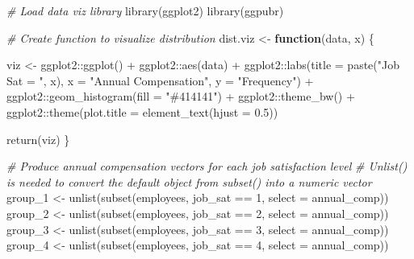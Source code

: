\documentclass[
]{book}
\newenvironment{Shaded}{\begin{snugshade}}{\end{snugshade}}
\newcommand{\AttributeTok}[1]{\textcolor[rgb]{0.77,0.63,0.00}{#1}}
\newcommand{\CommentTok}[1]{\textcolor[rgb]{0.56,0.35,0.01}{\textit{#1}}}
\newcommand{\ControlFlowTok}[1]{\textcolor[rgb]{0.13,0.29,0.53}{\textbf{#1}}}
\newcommand{\DecValTok}[1]{\textcolor[rgb]{0.00,0.00,0.81}{#1}}
\newcommand{\FloatTok}[1]{\textcolor[rgb]{0.00,0.00,0.81}{#1}}
\newcommand{\FunctionTok}[1]{\textcolor[rgb]{0.00,0.00,0.00}{#1}}
\newcommand{\NormalTok}[1]{#1}
\newcommand{\OtherTok}[1]{\textcolor[rgb]{0.56,0.35,0.01}{#1}}
\newcommand{\SpecialCharTok}[1]{\textcolor[rgb]{0.00,0.00,0.00}{#1}}
\newcommand{\StringTok}[1]{\textcolor[rgb]{0.31,0.60,0.02}{#1}}
\begin{document}
\begin{Shaded}
\begin{Highlighting}[]
\CommentTok{\# Load data viz library}
\FunctionTok{library}\NormalTok{(ggplot2)}
\FunctionTok{library}\NormalTok{(ggpubr)}

\CommentTok{\# Create function to visualize distribution}
\NormalTok{dist.viz }\OtherTok{\textless{}{-}} \ControlFlowTok{function}\NormalTok{(data, x) \{}
  
\NormalTok{viz }\OtherTok{\textless{}{-}}\NormalTok{ ggplot2}\SpecialCharTok{::}\FunctionTok{ggplot}\NormalTok{() }\SpecialCharTok{+} 
\NormalTok{       ggplot2}\SpecialCharTok{::}\FunctionTok{aes}\NormalTok{(data) }\SpecialCharTok{+} 
\NormalTok{       ggplot2}\SpecialCharTok{::}\FunctionTok{labs}\NormalTok{(}\AttributeTok{title =} \FunctionTok{paste}\NormalTok{(}\StringTok{"Job Sat = "}\NormalTok{, x), }\AttributeTok{x =} \StringTok{"Annual Compensation"}\NormalTok{, }\AttributeTok{y =} \StringTok{"Frequency"}\NormalTok{) }\SpecialCharTok{+} 
\NormalTok{       ggplot2}\SpecialCharTok{::}\FunctionTok{geom\_histogram}\NormalTok{(}\AttributeTok{fill =} \StringTok{"\#414141"}\NormalTok{) }\SpecialCharTok{+}
\NormalTok{       ggplot2}\SpecialCharTok{::}\FunctionTok{theme\_bw}\NormalTok{() }\SpecialCharTok{+}
\NormalTok{       ggplot2}\SpecialCharTok{::}\FunctionTok{theme}\NormalTok{(}\AttributeTok{plot.title =} \FunctionTok{element\_text}\NormalTok{(}\AttributeTok{hjust =} \FloatTok{0.5}\NormalTok{))}

  \FunctionTok{return}\NormalTok{(viz)}
\NormalTok{\}}

\CommentTok{\# Produce annual compensation vectors for each job satisfaction level}
\CommentTok{\# Unlist() is needed to convert the default object from subset() into a numeric vector}
\NormalTok{group\_1 }\OtherTok{\textless{}{-}} \FunctionTok{unlist}\NormalTok{(}\FunctionTok{subset}\NormalTok{(employees, job\_sat }\SpecialCharTok{==} \DecValTok{1}\NormalTok{, }\AttributeTok{select =}\NormalTok{ annual\_comp))}
\NormalTok{group\_2 }\OtherTok{\textless{}{-}} \FunctionTok{unlist}\NormalTok{(}\FunctionTok{subset}\NormalTok{(employees, job\_sat }\SpecialCharTok{==} \DecValTok{2}\NormalTok{, }\AttributeTok{select =}\NormalTok{ annual\_comp))}
\NormalTok{group\_3 }\OtherTok{\textless{}{-}} \FunctionTok{unlist}\NormalTok{(}\FunctionTok{subset}\NormalTok{(employees, job\_sat }\SpecialCharTok{==} \DecValTok{3}\NormalTok{, }\AttributeTok{select =}\NormalTok{ annual\_comp))}
\NormalTok{group\_4 }\OtherTok{\textless{}{-}} \FunctionTok{unlist}\NormalTok{(}\FunctionTok{subset}\NormalTok{(employees, job\_sat }\SpecialCharTok{==} \DecValTok{4}\NormalTok{, }\AttributeTok{select =}\NormalTok{ annual\_comp))}


\end{Highlighting}
\end{Shaded}
\end{document}
